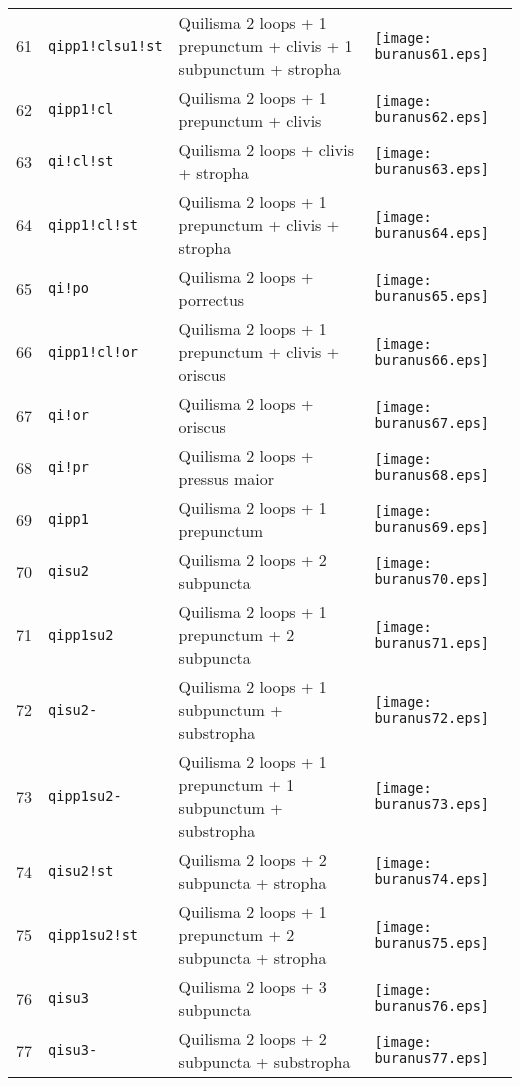 \documentclass{scrarticle}
\begin{document}
\begin{longtable}{l|l|l|l}
61 & \texttt{qipp1!clsu1!st} & Quilisma 2 loops + 1 prepunctum + clivis + 1 subpunctum + stropha & \texttt{[image: buranus61.eps]} \\
62 & \texttt{qipp1!cl} & Quilisma 2 loops + 1 prepunctum + clivis & \texttt{[image: buranus62.eps]} \\
63 & \texttt{qi!cl!st} & Quilisma 2 loops + clivis + stropha & \texttt{[image: buranus63.eps]} \\
64 & \texttt{qipp1!cl!st} & Quilisma 2 loops + 1 prepunctum + clivis + stropha & \texttt{[image: buranus64.eps]} \\
65 & \texttt{qi!po} & Quilisma 2 loops + porrectus & \texttt{[image: buranus65.eps]} \\
66 & \texttt{qipp1!cl!or} & Quilisma 2 loops + 1 prepunctum + clivis + oriscus & \texttt{[image: buranus66.eps]} \\
67 & \texttt{qi!or} & Quilisma 2 loops + oriscus & \texttt{[image: buranus67.eps]} \\
68 & \texttt{qi!pr} & Quilisma 2 loops + pressus maior & \texttt{[image: buranus68.eps]} \\
69 & \texttt{qipp1} & Quilisma 2 loops + 1 prepunctum & \texttt{[image: buranus69.eps]} \\
70 & \texttt{qisu2} & Quilisma 2 loops + 2 subpuncta & \texttt{[image: buranus70.eps]} \\
71 & \texttt{qipp1su2} & Quilisma 2 loops + 1 prepunctum + 2 subpuncta & \texttt{[image: buranus71.eps]} \\
72 & \texttt{qisu2-} & Quilisma 2 loops + 1 subpunctum + substropha & \texttt{[image: buranus72.eps]} \\
73 & \texttt{qipp1su2-} & Quilisma 2 loops + 1 prepunctum + 1 subpunctum + substropha & \texttt{[image: buranus73.eps]} \\
74 & \texttt{qisu2!st} & Quilisma 2 loops + 2 subpuncta + stropha & \texttt{[image: buranus74.eps]} \\
75 & \texttt{qipp1su2!st} & Quilisma 2 loops + 1 prepunctum + 2 subpuncta + stropha & \texttt{[image: buranus75.eps]} \\
76 & \texttt{qisu3} & Quilisma 2 loops + 3 subpuncta & \texttt{[image: buranus76.eps]} \\
77 & \texttt{qisu3-} & Quilisma 2 loops + 2 subpuncta + substropha & \texttt{[image: buranus77.eps]} \\

\end{longtable}
\end{document}
